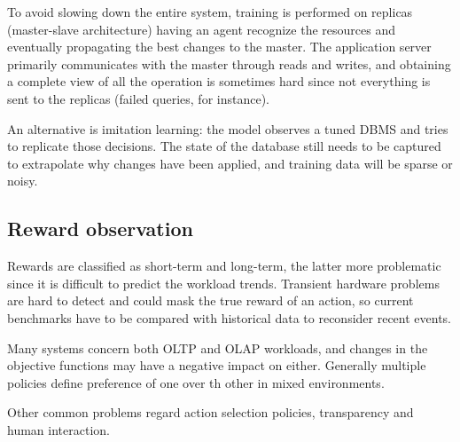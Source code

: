 To avoid slowing down the entire system, training is performed on replicas (master-slave architecture) having an agent recognize the resources and eventually propagating the best changes to the master. The application server primarily communicates with the master through reads and writes, and obtaining a complete view of all the operation is sometimes hard since not everything is sent to the replicas (failed queries, for instance). 

An alternative is imitation learning: the model observes a tuned DBMS and tries to replicate those decisions. The state of the database still needs to be captured to extrapolate why changes have been applied, and training data will be sparse or noisy.

\subsection{Reward observation}
Rewards are classified as short-term and long-term, the latter more problematic since it is difficult to predict the workload trends. Transient hardware problems are hard to detect and could mask the true reward of an action, so current benchmarks have to be compared with historical data to reconsider recent events. 

Many systems concern both OLTP and OLAP workloads, and changes in the objective functions may have a negative impact on either. Generally multiple policies define preference of one over th other in mixed environments. 

Other common problems regard action selection policies, transparency and human interaction. 
